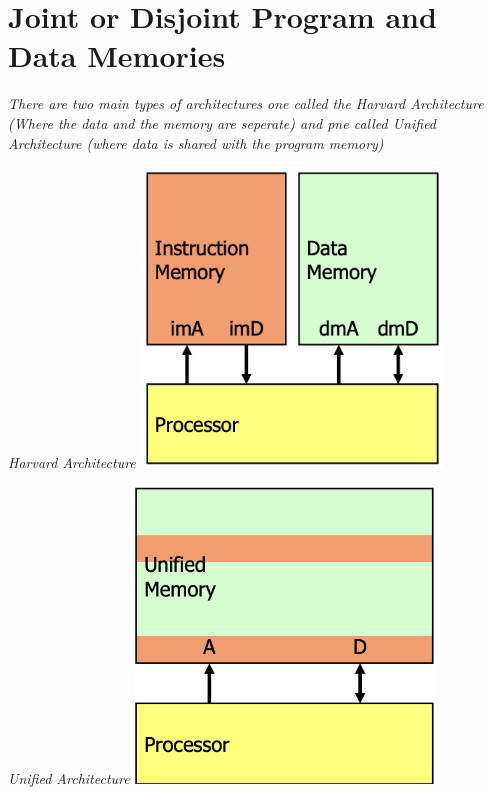 \section{Joint or Disjoint Program and Data Memories}
\textit{There are two main types of architectures one called the Harvard Architecture (Where the data and the memory are seperate) and pne called Unified Architecture (where data is shared with the program memory)} \newline
\begin{minipage}[htp]{0.4\textwidth}
    \textit{Harvard Architecture} \newline
    \centering
    \includegraphics[width=0.6\textwidth]{chapters/chapter1/images/harvard.png}
\end{minipage}
\hfill
\vline
\hfill
\begin{minipage}[htp]{0.4\textwidth}
    \textit{Unified Architecture} \newline
    \centering
    \includegraphics[width=0.6\textwidth]{chapters/chapter1/images/unified.png}
\end{minipage}


